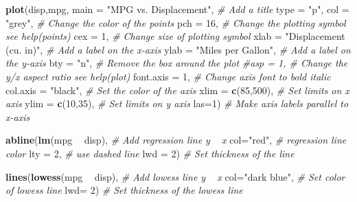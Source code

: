 \documentclass[]{book}
\newenvironment{Shaded}{\begin{snugshade}}{\end{snugshade}}
\newcommand{\KeywordTok}[1]{\textcolor[rgb]{0.13,0.29,0.53}{\textbf{#1}}}
\newcommand{\DataTypeTok}[1]{\textcolor[rgb]{0.13,0.29,0.53}{#1}}
\newcommand{\DecValTok}[1]{\textcolor[rgb]{0.00,0.00,0.81}{#1}}
\newcommand{\StringTok}[1]{\textcolor[rgb]{0.31,0.60,0.02}{#1}}
\newcommand{\CommentTok}[1]{\textcolor[rgb]{0.56,0.35,0.01}{\textit{#1}}}
\newcommand{\OperatorTok}[1]{\textcolor[rgb]{0.81,0.36,0.00}{\textbf{#1}}}
\newcommand{\NormalTok}[1]{#1}
\theoremstyle{definition}
\theoremstyle{definition}
\theoremstyle{definition}
\theoremstyle{remark}
\begin{document}
\begin{Shaded}
\begin{Highlighting}[]
\KeywordTok{plot}\NormalTok{(disp,mpg,}
     \DataTypeTok{main =} \StringTok{"MPG vs. Displacement"}\NormalTok{,    }\CommentTok{# Add a title}
     \DataTypeTok{type =} \StringTok{"p"}\NormalTok{,}
     \DataTypeTok{col =} \StringTok{"grey"}\NormalTok{,                     }\CommentTok{# Change the color of the points}
     \DataTypeTok{pch =} \DecValTok{16}\NormalTok{,                         }\CommentTok{# Change the plotting symbol  see help(points)}
     \DataTypeTok{cex =} \DecValTok{1}\NormalTok{,                          }\CommentTok{# Change size of plotting symbol     }
     \DataTypeTok{xlab =} \StringTok{"Displacement (cu. in)"}\NormalTok{,   }\CommentTok{# Add a label on the x-axis}
     \DataTypeTok{ylab =} \StringTok{"Miles per Gallon"}\NormalTok{,        }\CommentTok{# Add a label on the y-axis}
     \DataTypeTok{bty =} \StringTok{"n"}\NormalTok{,                        }\CommentTok{# Remove the box around the plot}
     \CommentTok{#asp = 1,                         # Change the y/x aspect ratio see help(plot)}
     \DataTypeTok{font.axis =} \DecValTok{1}\NormalTok{,                    }\CommentTok{# Change axis font to bold italic}
     \DataTypeTok{col.axis =} \StringTok{"black"}\NormalTok{,               }\CommentTok{# Set the color of the axis}
     \DataTypeTok{xlim =} \KeywordTok{c}\NormalTok{(}\DecValTok{85}\NormalTok{,}\DecValTok{500}\NormalTok{),                 }\CommentTok{# Set limits on x axis}
     \DataTypeTok{ylim =} \KeywordTok{c}\NormalTok{(}\DecValTok{10}\NormalTok{,}\DecValTok{35}\NormalTok{),                  }\CommentTok{# Set limits on y axis}
     \DataTypeTok{las=}\DecValTok{1}\NormalTok{)                            }\CommentTok{# Make axis labels parallel to x-axis}
 
\KeywordTok{abline}\NormalTok{(}\KeywordTok{lm}\NormalTok{(mpg }\OperatorTok{~}\StringTok{ }\NormalTok{disp),                 }\CommentTok{# Add regression line y ~ x}
       \DataTypeTok{col=}\StringTok{"red"}\NormalTok{,                      }\CommentTok{# regression line color}
       \DataTypeTok{lty =} \DecValTok{2}\NormalTok{,                        }\CommentTok{# use dashed line}
       \DataTypeTok{lwd =} \DecValTok{2}\NormalTok{)                        }\CommentTok{# Set thickness of the line}
 
\KeywordTok{lines}\NormalTok{(}\KeywordTok{lowess}\NormalTok{(mpg }\OperatorTok{~}\StringTok{ }\NormalTok{disp),              }\CommentTok{# Add lowess line y ~ x}
      \DataTypeTok{col=}\StringTok{"dark blue"}\NormalTok{,                 }\CommentTok{# Set color of lowess line}
      \DataTypeTok{lwd=} \DecValTok{2}\NormalTok{)                          }\CommentTok{# Set thickness of the lowess line}
 

\end{Highlighting}
\end{Shaded}
\end{document}
